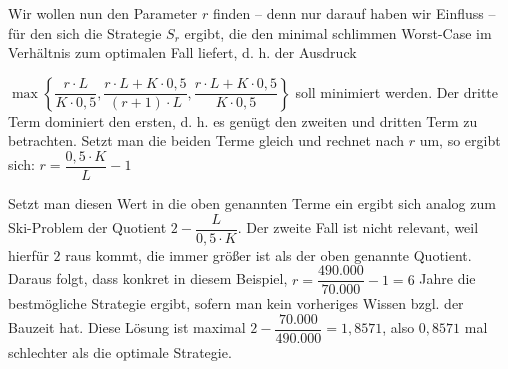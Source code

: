 \documentclass[a4paper, fontsize=10pt]{scrartcl}
\begin{document}
Wir wollen nun den Parameter $r$ finden -- denn nur darauf haben wir Einfluss -- für den sich die Strategie $S_r$ ergibt, die den minimal schlimmen Worst-Case im Verhältnis zum optimalen Fall liefert, d. h. der Ausdruck \smallskip

$\max\left \{ \dfrac{r\cdot L}{K\cdot 0,5}, \dfrac{r\cdot L + K\cdot 0,5}{(r+1)\cdot L}, \dfrac{r\cdot L+ K \cdot 0,5}{K\cdot 0,5} \right \}$ soll minimiert werden. Der dritte Term dominiert den ersten, d. h. es genügt den zweiten und dritten Term zu betrachten. Setzt man die beiden Terme gleich und rechnet nach $r$ um, so ergibt sich:
$r=\dfrac{0,5\cdot K}{L}-1$

Setzt man diesen Wert in die oben genannten Terme ein ergibt sich analog zum Ski-Problem der Quotient $2-\dfrac{L}{0,5\cdot K}$. Der zweite Fall ist nicht relevant, weil hierfür $2$ raus kommt, die immer größer ist als der oben genannte Quotient.\\

Daraus folgt, dass konkret in diesem Beispiel, $r=\dfrac{490.000}{70.000}-1=6$ Jahre die bestmögliche Strategie ergibt, sofern man kein vorheriges Wissen bzgl. der Bauzeit hat. Diese Lösung ist maximal $2-\dfrac{70.000}{490.000}=1,8571$, also $0,8571$ mal schlechter als die optimale Strategie.
 
\end{document}
